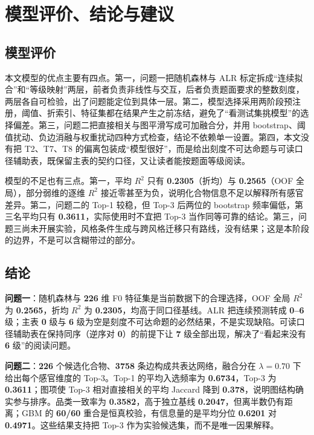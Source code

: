 \section{模型评价、结论与建议}

\subsection{模型评价}

本文模型的优点主要有四点。第一，问题一把随机森林与 ALR 标定拆成“连续拟合”和“等级映射”两层，前者负责非线性与交互，后者负责题面要求的整数刻度，两层各自可检验，出了问题能定位到具体一层。第二，模型选择采用两阶段预注册，阈值、折索引、特征集都在结果产生之前冻结，避免了“看测试集挑模型”的选择偏差。第三，问题二把直接相关与图平滑写成可加融合分，并用 bootstrap、阈值扰动、负边消融与权重扰动四种方式检查，结论不依赖单一设置。第四，本文没有把 T2、T7、T8 的偏离包装成“模型很好”，而是给出刻度不可达命题与可读口径辅助表，既保留主表的契约口径，又让读者能按题面等级阅读。

模型的不足也有三点。第一，平均 $R^2$ 只有 \textbf{0.2305}（折均）与 \textbf{0.2565}（OOF 全局），部分弱维的逐维 $R^2$ 接近零甚至为负，说明化合物信息不足以解释所有感官差异。第二，问题二的 Top-1 较稳，但 Top-3 后两位的 bootstrap 频率偏低，第三名平均只有 \textbf{0.3611}，实际使用时不宜把 Top-3 当作同等可靠的结论。第三，问题三尚未开展实验，风格条件生成与跨风格迁移只有路线，没有结果；这是本阶段的边界，不是可以含糊带过的部分。

\subsection{结论}

\textbf{问题一}：随机森林与 \textbf{226} 维 F0 特征集是当前数据下的合理选择，OOF 全局 $R^2$ 为 \textbf{0.2565}，折均 $R^2$ 为 \textbf{0.2305}，均高于同口径基线。ALR 把连续预测转成 \textbf{0--6} 级；主表 \textbf{0} 级与 \textbf{6} 级为空是刻度不可达命题的必然结果，不是实现缺陷。可读口径辅助表在保持同序（逆序对 \textbf{0}）的前提下让 \textbf{7} 级全部出现，解决了“看起来没有 \textbf{6} 级”的阅读问题。

\textbf{问题二}：\textbf{226} 个候选化合物、\textbf{3758} 条边构成共表达网络，融合分在 $\lambda=0.70$ 下给出每个感官维度的 Top-3。Top-1 的平均入选频率为 \textbf{0.6734}，Top-3 为 \textbf{0.3611}；图项使 Top-3 相对直接相关的平均 Jaccard 降到 \textbf{0.378}，说明图结构确实参与排序。品类一致率为 \textbf{0.3582}，高于独立基线 \textbf{0.2047}，但离半数仍有距离；GBM 的 \textbf{60/60} 重合是恒真校验，有信息量的是平均分位 \textbf{0.6201} 对 \textbf{0.4971}。这些结果支持把 Top-3 作为实验候选集，而不是唯一因果解释。

